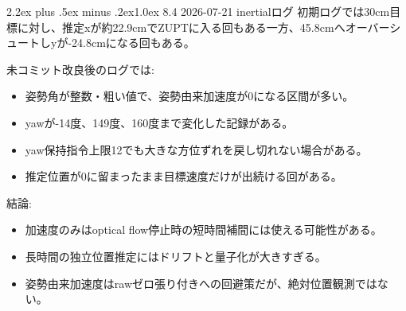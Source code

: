 \documentclass[10pt,a4paper,openany]{ltjsbook}
\makeatletter
\renewcommand\section{\@startsection{section}{1}{0pt}%
  {2.2ex plus .5ex minus .2ex}{1.0ex}%
  {\sffamily\Large\bfseries\color{ReportNavy}}}
\makeatother
\begin{document}
\section{8.4 2026-07-21 inertialログ}
初期ログでは30cm目標に対し、推定xが約22.9cmでZUPTに入る回もある一方、45.8cmへオーバーシュートしyが-24.8cmになる回もある。\par
未コミット改良後のログでは:\par
\begin{itemize}
\item 姿勢角が整数・粗い値で、姿勢由来加速度が0になる区間が多い。
\item yawが-14度、149度、160度まで変化した記録がある。
\item yaw保持指令上限12でも大きな方位ずれを戻し切れない場合がある。
\item 推定位置が0に留まったまま目標速度だけが出続ける回がある。
\end{itemize}
結論:\par
\begin{itemize}
\item 加速度のみはoptical flow停止時の短時間補間には使える可能性がある。
\item 長時間の独立位置推定にはドリフトと量子化が大きすぎる。
\item 姿勢由来加速度はrawゼロ張り付きへの回避策だが、絶対位置観測ではない。
\end{itemize}
\vspace{0.3em}{\noindent\color{ReportLight}\rule{\linewidth}{0.8pt}}\vspace{0.3em}
\end{document}
